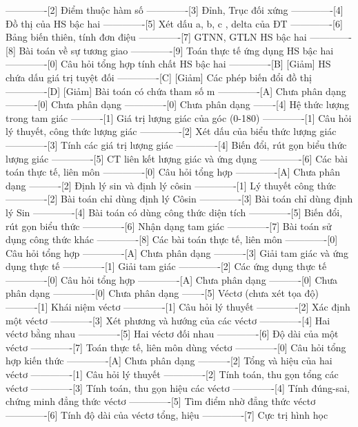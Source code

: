 -------------[2] Điểm thuộc hàm số
-------------[3] Đỉnh, Trục đối xứng
-------------[4] Đồ thị của HS bậc hai
-------------[5] Xét dấu a, b, c , delta của ĐT
-------------[6] Bảng biến thiên, tính đơn điệu
-------------[7] GTNN, GTLN HS bậc hai
-------------[8] Bài toán về sự tương giao
-------------[9] Toán thực tế ứng dụng HS bậc hai
-------------[0] Câu hỏi tổng hợp tính chất HS bậc hai
-------------[B] [Giảm] HS chứa dấu giá trị tuyệt đối
-------------[C] [Giảm] Các phép biến đổi đồ thị 
-------------[D] [Giảm] Bài toán có chứa tham số m
-------------[A] Chưa phân dạng
----------[0] Chưa phân dạng
-------------[0] Chưa phân dạng
-------[4] Hệ thức lượng trong tam giác
----------[1] Giá trị lượng giác của góc (0-180)
-------------[1] Câu hỏi lý thuyết, công thức lượng giác
-------------[2] Xét dấu của biểu thức lượng giác
-------------[3] Tính các giá trị lượng giác
-------------[4] Biến đổi, rút gọn biểu thức lượng giác
-------------[5] CT liên kết lượng giác và ứng dụng
-------------[6] Các bài toán thực tế, liên môn
-------------[0] Câu hỏi tổng hợp
-------------[A] Chưa phân dạng
----------[2] Định lý sin và định lý côsin
-------------[1] Lý thuyết công thức
-------------[2] Bài toán chỉ dùng định lý Côsin
-------------[3] Bài toán chỉ dùng định lý Sin 
-------------[4] Bài toán có dùng công thức diện tích
-------------[5] Biến đổi, rút gọn biểu thức
-------------[6] Nhận dạng tam giác
-------------[7] Bài toán sử dụng công thức khác
-------------[8] Các bài toán thực tế, liên môn
-------------[0] Câu hỏi tổng hợp
-------------[A] Chưa phân dạng
----------[3] Giải tam giác và ứng dụng thực tế
-------------[1] Giải tam giác
-------------[2] Các ứng dụng thực tế
-------------[0] Câu hỏi tổng hợp
-------------[A] Chưa phân dạng
----------[0] Chưa phân dạng
-------------[0] Chưa phân dạng
-------[5] Véctơ (chưa xét tọa độ)
----------[1] Khái niệm véctơ
-------------[1] Câu hỏi lý thuyết
-------------[2] Xác định một véctơ
-------------[3] Xét phương và hướng của các véctơ
-------------[4] Hai véctơ bằng nhau
-------------[5] Hai véctơ đối nhau
-------------[6] Độ dài của một véctơ
-------------[7] Toán thực tế, liên môn dùng véctơ
-------------[0] Câu hỏi tổng hợp kiến thức
-------------[A] Chưa phân dạng
----------[2] Tổng và hiệu của hai véctơ
-------------[1] Câu hỏi lý thuyết
-------------[2] Tính toán, thu gọn tổng các véctơ
-------------[3] Tính toán, thu gọn hiệu các véctơ
-------------[4] Tính đúng-sai, chứng minh đẳng thức véctơ
-------------[5] Tìm điểm nhờ đẳng thức véctơ
-------------[6] Tính độ dài của véctơ tổng, hiệu
-------------[7] Cực trị hình học

